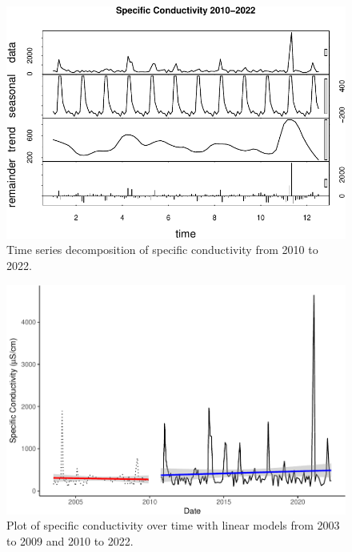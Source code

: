 \documentclass[
  12pt,
]{article}
\begin{document}
\begin{figure}

{\centering \includegraphics{Project_Template_files/figure-latex/Plot of Late Specific Conductivity Time Series Decomposition-1} 

}

\caption{Time series decomposition of specific conductivity from 2010 to 2022.}\label{fig:Plot of Late Specific Conductivity Time Series Decomposition}
\end{figure}

\newpage

\begin{figure}

{\centering \includegraphics{Project_Template_files/figure-latex/Plot of Specific Conductance over time with LMs-1} 

}

\caption{Plot of specific conductivity over time with linear models from 2003 to 2009 and 2010 to 2022.}\label{fig:Plot of Specific Conductance over time with LMs}
\end{figure}
\end{document}
